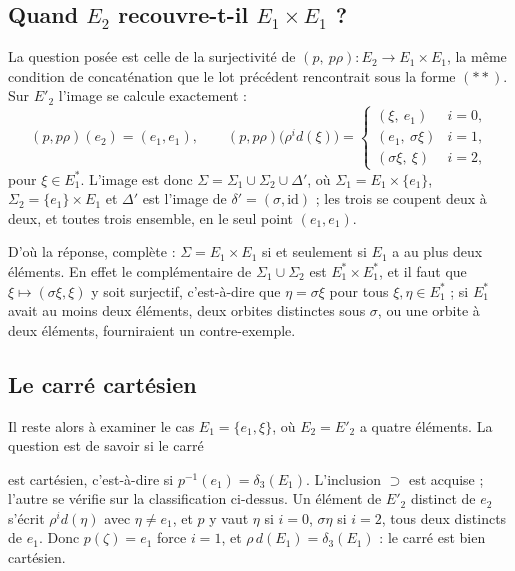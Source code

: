 \documentclass[11pt,a4paper]{article}
\begin{document}
\subsection*{Quand $E_{2}$ recouvre-t-il $E_{1} \times E_{1}$ ?}

La question posée est celle de la surjectivité de
$(p,\ p\rho) \colon E_{2} \to E_{1} \times E_{1}$, la même condition de
concaténation que le lot précédent rencontrait sous la forme $(**)$. Sur
$E'_{2}$ l'image se calcule exactement :
\[
  (p, p\rho)(e_{2}) = (e_{1},e_{1}), \qquad
  (p, p\rho)\bigl(\rho^{i}d(\xi)\bigr) =
  \begin{cases}
    (\xi,\ e_{1}) & i = 0, \\
    (e_{1},\ \sigma\xi) & i = 1, \\
    (\sigma\xi,\ \xi) & i = 2,
  \end{cases}
\]
pour $\xi \in E^{*}_{1}$. L'image est donc
$\Sigma = \Sigma_{1} \cup \Sigma_{2} \cup \Delta'$, où $\Sigma_{1} = E_{1}
\times \{e_{1}\}$, $\Sigma_{2} = \{e_{1}\} \times E_{1}$ et $\Delta'$ est
l'image de $\delta' = (\sigma, \mathrm{id})$ ; les trois se coupent deux à deux,
et toutes trois ensemble, en le seul point $(e_{1},e_{1})$.

D'où la réponse, complète : $\Sigma = E_{1} \times E_{1}$ si et seulement si
$E_{1}$ a au plus deux éléments. En effet le complémentaire de
$\Sigma_{1} \cup \Sigma_{2}$ est $E^{*}_{1} \times E^{*}_{1}$, et il faut que
$\xi \mapsto (\sigma\xi,\xi)$ y soit surjectif, c'est-à-dire que
$\eta = \sigma\xi$ pour tous $\xi,\eta \in E^{*}_{1}$ ; si $E^{*}_{1}$ avait au
moins deux éléments, deux orbites distinctes sous $\sigma$, ou une orbite à deux
éléments, fourniraient un contre-exemple.

\subsection*{Le carré cartésien}

Il reste alors à examiner le cas $E_{1} = \{e_{1},\xi\}$, où $E_{2} = E'_{2}$ a
quatre éléments. La question est de savoir si le carré
est cartésien, c'est-à-dire si $p^{-1}(e_{1}) = \delta_{3}(E_{1})$. L'inclusion
$\supset$ est acquise ; l'autre se vérifie sur la classification ci-dessus. Un
élément de $E'_{2}$ distinct de $e_{2}$ s'écrit $\rho^{i}d(\eta)$ avec
$\eta \neq e_{1}$, et $p$ y vaut $\eta$ si $i = 0$, $\sigma\eta$ si $i = 2$,
tous deux distincts de $e_{1}$. Donc $p(\zeta) = e_{1}$ force $i = 1$, et
$\rho\,d(E_{1}) = \delta_{3}(E_{1})$ : le carré est bien cartésien.
\end{document}
